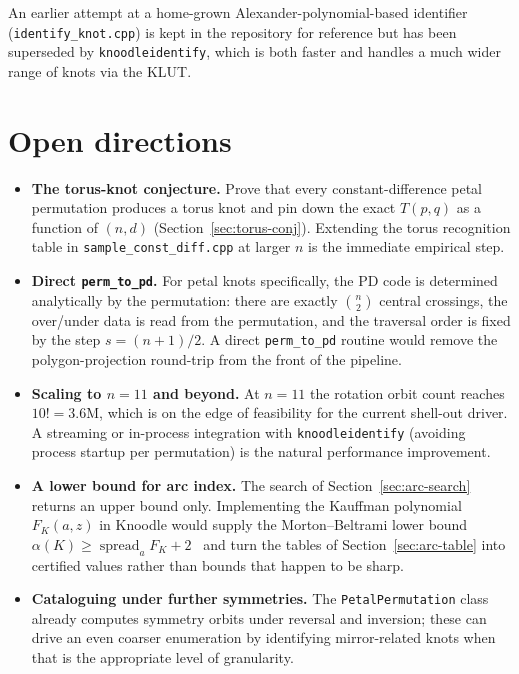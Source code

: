 \documentclass[11pt,oneside]{report}
\theoremstyle{definition}
\begin{document}
An earlier attempt at a home-grown Alexander-polynomial-based identifier
(\texttt{identify\_knot.cpp}) is kept in the repository for reference but
has been superseded by \texttt{knoodleidentify}, which is both faster and
handles a much wider range of knots via the KLUT.

\section{Open directions}

\begin{itemize}[leftmargin=2em]
\item \textbf{The torus-knot conjecture.} Prove that every
constant-difference petal permutation produces a torus knot and pin
down the exact $T(p, q)$ as a function of $(n, d)$
(Section~\ref{sec:torus-conj}). Extending the torus recognition
table in \texttt{sample\_const\_diff.cpp} at larger $n$ is the
immediate empirical step.
\item \textbf{Direct \texttt{perm\_to\_pd}.} For petal knots specifically,
the PD code is determined analytically by the permutation: there are
exactly $\binom{n}{2}$ central crossings, the over/under data is read
from the permutation, and the traversal order is fixed by the step
$s = (n+1)/2$. A direct \texttt{perm\_to\_pd} routine would remove the
polygon-projection round-trip from the front of the pipeline.
\item \textbf{Scaling to $n = 11$ and beyond.} At $n = 11$ the rotation
orbit count reaches $10! = 3.6$M, which is on the edge of feasibility
for the current shell-out driver. A streaming or in-process
integration with \texttt{knoodleidentify} (avoiding process startup
per permutation) is the natural performance improvement.
\item \textbf{A lower bound for arc index.} The search of
Section~\ref{sec:arc-search} returns an upper bound only. Implementing the
Kauffman polynomial $F_K(a,z)$ in Knoodle would supply the Morton--Beltrami
lower bound $\alpha(K) \geq \operatorname{spread}_a F_K + 2$~\cite{MortonBeltrami}
and turn the tables of Section~\ref{sec:arc-table} into certified values
rather than bounds that happen to be sharp.
\item \textbf{Cataloguing under further symmetries.} The
\texttt{PetalPermutation} class already computes symmetry orbits under
reversal and inversion; these can drive an even coarser enumeration
by identifying mirror-related knots when that is the appropriate
level of granularity.
\end{itemize}
\end{document}
